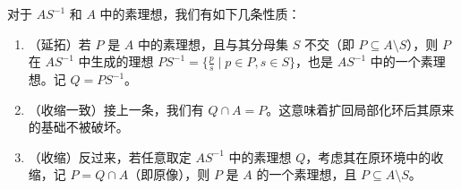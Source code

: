 \documentclass[11pt]{article}
\begin{document}
\begin{cnproperty}[局部化环中的素理想]
对于 $AS^{-1}$ 和 $A$ 中的素理想，我们有如下几条性质：
\begin{enumerate}
    \item （延拓）若 $P$ 是 $A$ 中的素理想，且与其分母集 $S$ 不交（即 $P \subseteq A \setminus S$），则 $P$ 在 $AS^{-1}$ 中生成的理想 $PS^{-1} = \{ \frac{p}{s} \mid p \in P, s \in S \}$，也是 $AS^{-1}$ 中的一个素理想。记 $Q = PS^{-1}$。
    \item （收缩一致）接上一条，我们有 $Q \cap A = P$。这意味着扩回局部化环后其原来的基础不被破坏。 %
    \item （收缩）反过来，若任意取定 $AS^{-1}$ 中的素理想 $Q$，考虑其在原环境中的收缩，记 $P = Q \cap A$（即原像），则 $P$ 是 $A$ 的一个素理想，且 $P \subseteq A \setminus S$。
\end{enumerate}
\end{cnproperty}
\end{document}
